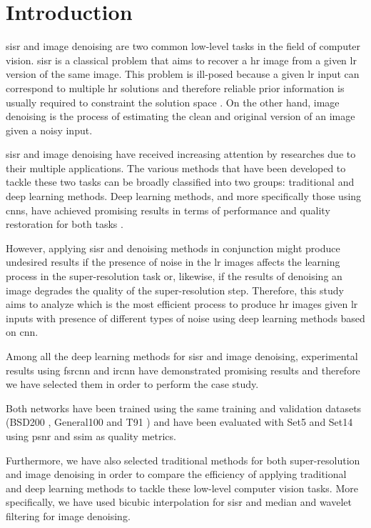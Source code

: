 \section{Introduction}

\Gls{sisr} and image denoising are two common low-level tasks in the field of computer vision. \Gls{sisr} is a classical problem that aims to recover a \gls{hr} image from a given \gls{lr} version of the same image. This problem is ill-posed because a given \gls{lr} input can correspond to multiple \gls{hr} solutions and therefore reliable prior information is usually required to constraint the solution space \cite{DBLP:SISR} \cite{SRCNN} \cite{DBLP:DEEPSISR}. On the other hand, image denoising is the process of estimating the clean and original version of an image given a noisy input.

\gls{sisr} and image denoising have received increasing attention by researches due to their multiple applications. The various methods that have been developed to tackle these two tasks can be broadly classified into two groups: traditional and deep learning methods. Deep learning methods, and more specifically those using \glspl{cnn}, have achieved promising results in terms of performance and quality restoration for both tasks \cite{DBLP:DEEPSISR} \cite{DBLP:DEEPNR}.

However, applying \gls{sisr} and denoising methods in conjunction might produce undesired results if the presence of noise in the \gls{lr} images affects the learning process in the super-resolution task or, likewise, if the results of denoising an image degrades the quality of the super-resolution step. Therefore, this study aims to analyze which is the most efficient process to produce \gls{hr} images given \gls{lr} inputs with presence of different types of noise using deep learning methods based on \gls{cnn}.

Among all the deep learning methods for \gls{sisr} and image denoising, experimental results using \gls{fsrcnn} \cite{FSRCNN} and \gls{ircnn} \cite{IRCNN} have demonstrated promising results and therefore we have selected them in order to perform the case study.

Both networks have been trained using the same training and validation datasets (BSD200 \cite{BSDS}, General100 \cite{FSRCNN} and T91 \cite{T91}) and have been evaluated with Set5 \cite{SET5} and Set14 \cite{SET14} using \gls{psnr} and \gls{ssim} as quality metrics.

Furthermore, we have also selected traditional methods for both super-resolution and image denoising in order to compare the efficiency of applying traditional and deep learning methods to tackle these low-level computer vision tasks. More specifically, we have used bicubic interpolation for \gls{sisr} and median and wavelet filtering for image denoising.

